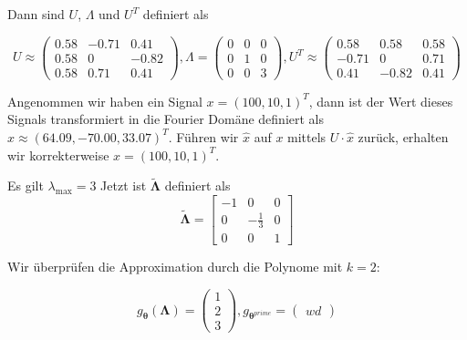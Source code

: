 Dann sind $U$, $\Lambda$ und $U^T$ definiert als

\begin{equation}
  U \approx \begin{pmatrix}
    0.58 & -0.71 & 0.41\\
    0.58 & 0 & -0.82\\
    0.58 & 0.71 & 0.41
  \end{pmatrix},
  \Lambda = \begin{pmatrix}
    0 & 0 & 0\\
    0 & 1 & 0\\
    0 & 0 & 3
  \end{pmatrix},
  U^T \approx \begin{pmatrix}
    0.58 & 0.58 & 0.58\\
    -0.71 & 0 & 0.71\\
    0.41 & -0.82 & 0.41
  \end{pmatrix}
\end{equation}

Angenommen wir haben ein Signal $x = {(100, 10, 1)}^T$, dann ist der Wert dieses Signals transformiert in die Fourier Domäne definiert als $\hat x \approx {(64.09, -70.00, 33.07)}^T$.
Führen wir $\hat x$ auf $x$ mittels $U \cdot \hat x$ zurück, erhalten wir korrekterweise $x = {(100, 10, 1)}^T$.

Es gilt $\lambda_{\max} = 3$
Jetzt ist $\mathbf{\tilde \Lambda}$ definiert als
\begin{equation}
  \mathbf{\tilde \Lambda} = \begin{bmatrix}
    -1 & 0 & 0\\
    0 & -\frac{1}{3} & 0\\
    0 & 0 & 1
  \end{bmatrix}
\end{equation}

Wir überprüfen die Approximation durch die Polynome mit $k = 2$:

\begin{equation}
  g_{\mathbf{\theta}}\left(\mathbf{\Lambda}\right) = \begin{pmatrix}
    1\\2\\3
  \end{pmatrix},
  g_{\mathbf{\theta}^{prime}} = \begin{pmatrix}
    wd
  \end{pmatrix}
\end{equation}
